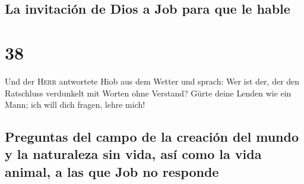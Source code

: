\hypertarget{la-invitaciuxf3n-de-dios-a-job-para-que-le-hable}{%
\subsection{La invitación de Dios a Job para que le
hable}\label{la-invitaciuxf3n-de-dios-a-job-para-que-le-hable}}

\hypertarget{section-37}{%
\section{38}\label{section-37}}

 Und der \textsc{Herr} antwortete Hiob aus dem Wetter und
sprach:  Wer ist der, der den Ratschluss verdunkelt mit
Worten ohne Verstand?  Gürte deine Lenden wie ein Mann;
ich will dich fragen, lehre mich!

\hypertarget{preguntas-del-campo-de-la-creaciuxf3n-del-mundo-y-la-naturaleza-sin-vida-asuxed-como-la-vida-animal-a-las-que-job-no-responde}{%
\subsection{Preguntas del campo de la creación del mundo y la naturaleza
sin vida, así como la vida animal, a las que Job no
responde}\label{preguntas-del-campo-de-la-creaciuxf3n-del-mundo-y-la-naturaleza-sin-vida-asuxed-como-la-vida-animal-a-las-que-job-no-responde}}

